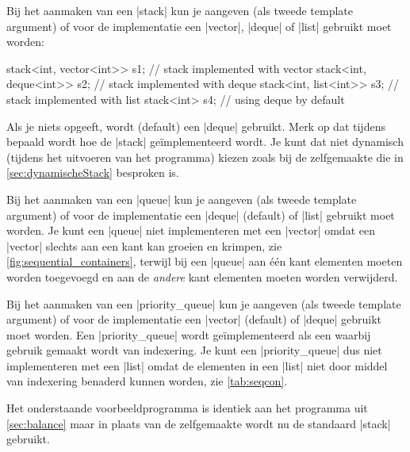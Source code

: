 \begin{cpplstShortInline}
Bij het aanmaken van een |stack| kun je aangeven (als tweede template argument) of voor de implementatie een |vector|, |deque| of
|list| gebruikt moet worden:

\begin{cpplstfragment}
stack<int, vector<int>> s1; // stack implemented with vector
stack<int, deque<int>> s2;  // stack implemented with deque
stack<int, list<int>> s3;   // stack implemented with list
stack<int> s4;              // using deque by default
\end{cpplstfragment}

Als je niets opgeeft, wordt (default) een |deque| gebruikt.
Merk op dat tijdens  bepaald wordt hoe de |stack| geïmplementeerd wordt.
Je kunt dat niet dynamisch (tijdens het uitvoeren van het programma) kiezen zoals bij de zelfgemaakte  die in \cref{sec:dynamischeStack} besproken is.

Bij het aanmaken van een |queue| kun je aangeven (als tweede template argument) of voor de implementatie een |deque| (default) of |list| gebruikt moet worden.
Je kunt een |queue| niet implementeren met een |vector| omdat een |vector| slechts aan een kant kan groeien en krimpen, zie \cref{fig:sequential_containers}, terwijl bij een |queue| aan één kant elementen moeten worden toegevoegd en aan de \emph{andere} kant elementen moeten worden verwijderd.

Bij het aanmaken van een |priority_queue| kun je aangeven (als tweede template argument) of voor de implementatie een |vector| (default) of |deque| gebruikt moet worden.
Een |priority_queue| wordt geïmplementeerd als een \footnotemark{} waarbij gebruik gemaakt wordt van indexering.
Je kunt een |priority_queue| dus niet implementeren met een |list| omdat de elementen in een |list| niet door middel van indexering benaderd kunnen worden, zie \cref{tab:seqcon}.

Het onderstaande voorbeeldprogramma  is identiek aan het programma uit \cref{sec:balance} maar in plaats van de zelfgemaakte  wordt nu de standaard |stack| gebruikt.


\end{cpplstShortInline}
